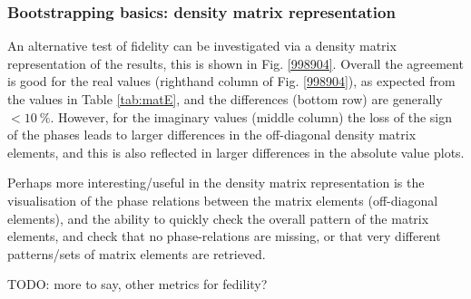 \subsubsection{Bootstrapping basics: density matrix representation}

An alternative test of fidelity can be investigated via a density matrix representation of the results, this is shown in Fig. \ref{998904}. Overall the agreement is good for the real values (righthand column of Fig. \ref{998904}), as expected from the values in Table \ref{tab:matE}, and the differences (bottom row) are generally $<10~\%$. However, for the imaginary values (middle column) the loss of the sign of the phases leads to larger differences in the off-diagonal density matrix elements, and this is also reflected in larger differences in the absolute value plots.

Perhaps more interesting/useful in the density matrix representation is the visualisation of the phase relations between the matrix elements (off-diagonal elements), and the ability to quickly check the overall pattern of the matrix elements, and check that no phase-relations are missing, or that very different patterns/sets of matrix elements are retrieved. 

TODO: more to say, other metrics for fedility?
